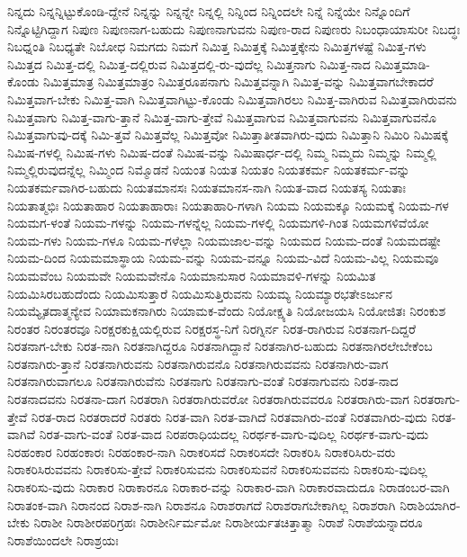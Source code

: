 {ನಿನ್ನದು
ನಿನ್ನನ್ನಿಟ್ಟುಕೊಂಡಿ-ದ್ದೇನೆ
ನಿನ್ನನ್ನು
ನಿನ್ನನ್ನೇ
ನಿನ್ನಲ್ಲಿ
ನಿನ್ನಿಂದ
ನಿನ್ನಿಂದಲೇ
ನಿನ್ನೆ
ನಿನ್ನೆಯೇ
ನಿನ್ನೊಂದಿಗೆ
ನಿನ್ನೊಟ್ಟಿಗಿದ್ದಾಗ
ನಿಪುಣ
ನಿಪುಣನಾಗ-ಬಹುದು
ನಿಪುಣನಾಗುವನು
ನಿಪುಣ-ರಾದ
ನಿಪುಣರು
ನಿಬಂಧಾಯಾಸುರೀ
ನಿಬದ್ಧಃ
ನಿಬಧ್ನಂತಿ
ನಿಬಧ್ಯತೇ
ನಿಬೋಧ
ನಿಮಗದು
ನಿಮಗೆ
ನಿಮಿತ್ತ
ನಿಮಿತ್ತಕ್ಕೆ
ನಿಮಿತ್ತಕ್ಕೇನು
ನಿಮಿತ್ತಗಳಷ್ಟೆ
ನಿಮಿತ್ತ-ಗಳು
ನಿಮಿತ್ತದ
ನಿಮಿತ್ತ-ದಲ್ಲಿ
ನಿಮಿತ್ತ-ದಲ್ಲಿರುವ
ನಿಮಿತ್ತದಲ್ಲಿ-ರು-ವುದೆಲ್ಲ
ನಿಮಿತ್ತನಾಗು
ನಿಮಿತ್ತ-ನಾದ
ನಿಮಿತ್ತಮಾಡಿ-ಕೊಂಡು
ನಿಮಿತ್ತಮಾತ್ರ
ನಿಮಿತ್ತಮಾತ್ರಂ
ನಿಮಿತ್ತರೂಪನಾಗು
ನಿಮಿತ್ತವನ್ನಾಗಿ
ನಿಮಿತ್ತ-ವನ್ನು
ನಿಮಿತ್ತವಾಗಬೇಕಾದರೆ
ನಿಮಿತ್ತವಾಗ-ಬೇಕು
ನಿಮಿತ್ತ-ವಾಗಿ
ನಿಮಿತ್ತವಾಗಿಟ್ಟು-ಕೊಂಡು
ನಿಮಿತ್ತವಾಗಿರಲು
ನಿಮಿತ್ತ-ವಾಗಿರುವ
ನಿಮಿತ್ತವಾಗಿರುವನು
ನಿಮಿತ್ತವಾಗು
ನಿಮಿತ್ತ-ವಾಗು-ತ್ತಾನೆ
ನಿಮಿತ್ತ-ವಾಗು-ತ್ತೇವೆ
ನಿಮಿತ್ತವಾಗುವ
ನಿಮಿತ್ತವಾಗುವನು
ನಿಮಿತ್ತವಾಗುವನೊ
ನಿಮಿತ್ತವಾಗುವು-ದಕ್ಕೆ
ನಿಮಿ-ತ್ತವೆ
ನಿಮಿತ್ತವೆಲ್ಲ
ನಿಮಿತ್ತವೋ
ನಿಮಿತ್ತಾತೀತವಾಗಿರು-ವುದು
ನಿಮಿತ್ತಾನಿ
ನಿಮಿರಿ
ನಿಮಿಷಕ್ಕೆ
ನಿಮಿಷ-ಗಳಲ್ಲಿ
ನಿಮಿಷ-ಗಳು
ನಿಮಿಷ-ದಂತೆ
ನಿಮಿಷ-ವನ್ನು
ನಿಮಿಷಾರ್ಧ-ದಲ್ಲಿ
ನಿಮ್ಮ
ನಿಮ್ಮದು
ನಿಮ್ಮನ್ನು
ನಿಮ್ಮಲ್ಲಿ
ನಿಮ್ಮಲ್ಲಿರುವುದನ್ನೆಲ್ಲ
ನಿಮ್ಮಿಂದ
ನಿಮ್ಮೊಡನೆ
ನಿಯಂತ
ನಿಯತ
ನಿಯತಂ
ನಿಯತಕರ್ಮ
ನಿಯತಕರ್ಮ-ವನ್ನು
ನಿಯತಕರ್ಮವಾಗಿರ-ಬಹುದು
ನಿಯತಮಾನಸಃ
ನಿಯತಮಾನಸ-ನಾಗಿ
ನಿಯತ-ವಾದ
ನಿಯತಸ್ಯ
ನಿಯತಾಃ
ನಿಯತಾತ್ಮಭಿಃ
ನಿಯತಾಹಾರ
ನಿಯತಾಹಾರಾಃ
ನಿಯತಾಹಾರಿ-ಗಳಾಗಿ
ನಿಯಮ
ನಿಯಮಕ್ಕೂ
ನಿಯಮಕ್ಕೆ
ನಿಯಮ-ಗಳ
ನಿಯಮಗ-ಳಂತೆ
ನಿಯಮ-ಗಳನ್ನು
ನಿಯಮ-ಗಳನ್ನೆಲ್ಲ
ನಿಯಮ-ಗಳಲ್ಲಿ
ನಿಯಮಗಳಿ-ಗಿಂತ
ನಿಯಮಗಳಿವೆಯೋ
ನಿಯಮ-ಗಳು
ನಿಯಮ-ಗಳೂ
ನಿಯಮ-ಗಳೆಲ್ಲಾ
ನಿಯಮಜಾಲ-ವನ್ನು
ನಿಯಮದ
ನಿಯಮ-ದಂತೆ
ನಿಯಮದಷ್ಟೇ
ನಿಯಮ-ದಿಂದ
ನಿಯಮಮಾಸ್ಥಾಯ
ನಿಯಮ-ವನ್ನು
ನಿಯಮ-ವನ್ನೂ
ನಿಯಮ-ವಿದೆ
ನಿಯಮ-ವಿಲ್ಲ
ನಿಯಮವೂ
ನಿಯಮವೆಂಬ
ನಿಯಮವೇ
ನಿಯಮವೇನೊ
ನಿಯಮಾನುಸಾರ
ನಿಯಮಾವಳಿ-ಗಳನ್ನು
ನಿಯಮಿತ
ನಿಯಮಿಸಿರಬಹುದೆಂದು
ನಿಯಮಿಸುತ್ತಾರೆ
ನಿಯಮಿಸುತ್ತಿರುವನು
ನಿಯಮ್ಯ
ನಿಯಮ್ಯಾರಭತೇಽರ್ಜುನ
ನಿಯಮ್ಯೈತದಾತ್ಮನ್ಯೇವ
ನಿಯಾಮಕನಾಗಿರು
ನಿಯಾಮಕ-ವೆಂದು
ನಿಯೋಕ್ಷ್ಯತಿ
ನಿಯೋಜಯಸಿ
ನಿಯೋಜಿತಃ
ನಿರಂಕುಶ
ನಿರಂತರ
ನಿರಂತರವೂ
ನಿರಕ್ಷರಕುಕ್ಷಿಯಲ್ಲಿರುವ
ನಿರಕ್ಷರಸ್ಥ-ನಿಗೆ
ನಿರಗ್ನಿರ್ನ
ನಿರತ-ರಾಗಿರುವ
ನಿರತನಾಗ-ದಿದ್ದರೆ
ನಿರತನಾಗ-ಬೇಕು
ನಿರತ-ನಾಗಿ
ನಿರತನಾಗಿದ್ದರೂ
ನಿರತನಾಗಿದ್ದಾನೆ
ನಿರತನಾಗಿರ-ಬಹುದು
ನಿರತನಾಗಿರಲೇಬೇಕೆಂಬ
ನಿರತನಾಗಿರು-ತ್ತಾನೆ
ನಿರತನಾಗಿರುವನು
ನಿರತನಾಗಿರುವನೊ
ನಿರತನಾಗಿರುವವನು
ನಿರತನಾಗಿರು-ವಾಗ
ನಿರತನಾಗಿರುವಾಗಲೂ
ನಿರತನಾಗಿರುವೆನು
ನಿರತನಾಗು
ನಿರತನಾಗು-ವಂತೆ
ನಿರತನಾಗುವನು
ನಿರತ-ನಾದ
ನಿರತನಾದವನು
ನಿರತನಾ-ದಾಗ
ನಿರತರಾಗಿ
ನಿರತರಾಗಿರುವರೋ
ನಿರತರಾಗಿರುವವರೂ
ನಿರತರಾಗಿರು-ವಾಗ
ನಿರತರಾಗು-ತ್ತೇವೆ
ನಿರತ-ರಾದ
ನಿರತರಾದರೆ
ನಿರತರು
ನಿರತ-ವಾಗಿ
ನಿರತ-ವಾಗಿದೆ
ನಿರತವಾಗಿರು-ವಂತೆ
ನಿರತವಾಗಿರು-ವುದು
ನಿರತ-ವಾಗಿವೆ
ನಿರತ-ವಾಗು-ವಂತೆ
ನಿರತ-ವಾದ
ನಿರಪರಾಧಿಯದಲ್ಲ
ನಿರರ್ಥಕ-ವಾಗು-ವುದಿಲ್ಲ
ನಿರರ್ಥಕ-ವಾಗು-ವುದು
ನಿರಹಂಕಾರ
ನಿರಹಂಕಾರಃ
ನಿರಹಂಕಾರ-ನಾಗಿ
ನಿರಾಕರಿಸದೆ
ನಿರಾಕರಿಸದೇ
ನಿರಾಕರಿಸಿ
ನಿರಾಕರಿಸಿರು-ವರು
ನಿರಾಕರಿಸಿರುವವನು
ನಿರಾಕರಿಸು-ತ್ತೇವೆ
ನಿರಾಕರಿಸುವನು
ನಿರಾಕರಿಸುವನೆ
ನಿರಾಕರಿಸುವವನು
ನಿರಾಕರಿಸು-ವುದಿಲ್ಲ
ನಿರಾಕರಿಸು-ವುದು
ನಿರಾಕಾರ
ನಿರಾಕಾರನೂ
ನಿರಾಕಾರ-ವನ್ನು
ನಿರಾಕಾರ-ವಾಗಿ
ನಿರಾಕಾರವಾದುದೂ
ನಿರಾಡಂಬರ-ವಾಗಿ
ನಿರಾತಂಕ-ವಾಗಿ
ನಿರಾನಂದ
ನಿರಾಶ-ನಾಗಿ
ನಿರಾಶನೂ
ನಿರಾಶರಾಗದೆ
ನಿರಾಶರಾಗಬೇಕಾಗಿಲ್ಲ
ನಿರಾಶರಾಗಿ
ನಿರಾಶಿಯಾಗಿರ-ಬೇಕು
ನಿರಾಶೀ
ನಿರಾಶೀರಪರಿಗ್ರಹಃ
ನಿರಾಶೀರ್ನಿರ್ಮಮೋ
ನಿರಾಶೀರ್ಯತಚಿತ್ತಾತ್ಮಾ
ನಿರಾಶೆ
ನಿರಾಶೆಯನ್ನಾದರೂ
ನಿರಾಶೆಯಿಂದಲೇ
ನಿರಾಶ್ರಯಃ
}
